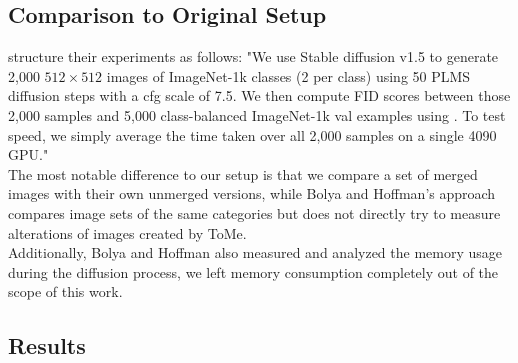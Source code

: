\newpage
\subsection{Comparison to Original Setup}
\cite{bolya2023tomesd} structure their experiments as follows: "We use Stable diffusion v1.5 to generate 2,000 $512 \times 512$ images of ImageNet-1k \cite{deng2009imagenet} classes (2 per class) using 50 PLMS \cite{liu2022pseudo} diffusion steps with a cfg scale \cite{dhariwal2021diffusion} of 7.5. We then compute FID scores between those 2,000 samples and 5,000 class-balanced ImageNet-1k val examples using \cite{Seitzer2020FID}. To test speed, we simply average the time taken over all 2,000 samples on a single 4090 GPU."\\
The most notable difference to our setup is that we compare a set of merged images with their own unmerged versions, while Bolya and Hoffman's approach compares image sets of the same categories but does not directly try to measure alterations of images created by ToMe.\\
Additionally, Bolya and Hoffman also measured and analyzed the memory usage during the diffusion process, we left memory consumption completely out of the scope of this work.



\subsection{Results}




